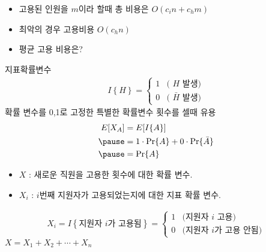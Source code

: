 \documentclass[10pt]{beamer}
\begin{document}
\begin{frame}{}
    \begin{itemize}
        \item 고용된 인원을 $m$이라 할때 총 비용은 $O(c_in + c_hm)$
        \item 최악의 경우 고용비용
        \pause
        $O(c_hn)$
        \item 평균 고용 비용은?
    \end{itemize}
\end{frame}


\begin{frame}{지표확률변수}
    \begin{align*}
        I\left\{ H \right\} =  
    \begin{cases}
        1 &\mbox{( $H$ 발생)} \\
        0 &\mbox{( $\bar{H}$ 발생)}
    \end{cases}   
    \end{align*}
    확률 변수를 0,1로 고정한 특별한 확률변수 횟수를 셀때 유용
    \pause
    \[
        \begin{aligned}
        E[X_A] &= E[I\{A\}] \\  \pause
            &=1 \cdot \Pr\{A\} + 0 \cdot \Pr\{\bar{A}\}\\ \pause
            &= \Pr\{A\}        
        \end{aligned}
    \]
\end{frame}



\begin{frame}{}
    \begin{itemize}
        \item $X$ : 새로운 직원을 고용한 횟수에 대한 확률 변수.
        \item $X_i$ : $i$번째 지원자가 고용되었는지에 대한 지표 확률 변수.
    \end{itemize}

    \begin{align*}
       X_i  = I\left\{ \mbox{지원자 $i$가 고용됨} \right\} =  
    \begin{cases}
        1 &\mbox{(지원자 $i$ 고용)} \\
        0 &\mbox{(지원자 $i$가 고용 안됨)}
    \end{cases}    
    \end{align*}
    $X = X_1 + X_2 + \cdots + X_n$
\end{frame}
\end{document}
